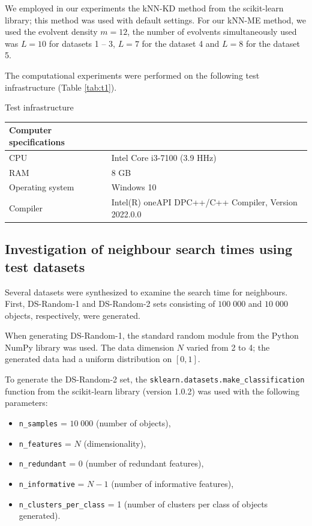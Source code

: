 \documentclass[entropy,article,submit,moreauthors,pdftex]{Definitions/mdpi}
\begin{document}
\begin{paracol}{2}
We employed in our experiments the kNN-KD method from the scikit-learn library; this method was used with default settings. For our kNN-ME method, we used the evolvent density $m=12$, the number of evolvents simultaneously used was $L=10$ for datasets 1 -- 3, $L=7$ for the dataset 4 and $L=8$ for the dataset 5.


The computational experiments were performed on the following test infrastructure (Table \ref{tab:t1}).

\begin{specialtable}[H] 
    \caption{Test infrastructure}\label{tab:t1}
	\center
\begin{tabular}{ll}
\toprule
	  Computer specifications & \\
\midrule													
		CPU & Intel Core i3-7100 (3.9 HHz) \\
		RAM & 8 GB \\ 
		Operating system & Windows 10 \\
		Compiler & Intel(R) oneAPI DPC++/C++ Compiler, Version 2022.0.0 \\
\bottomrule
\end{tabular}
\end{specialtable}

\subsection{Investigation of neighbour search times using test datasets}

Several datasets were synthesized to examine the search time for neighbours. First, DS-Random-1 and DS-Random-2 sets consisting of $100\;000$ and $10\;000$ objects, respectively, were generated.

When generating DS-Random-1, the standard random module from the Python NumPy library was used. The data dimension $N$ varied from 2 to 4; the generated data had a uniform distribution on $[0, 1]$.

To generate the DS-Random-2 set, the \texttt{sklearn.datasets.make\_classification} function from the scikit-learn library (version 1.0.2) was used with the following parameters: 

\begin{itemize}
\item \texttt{n\_samples} = $10\;000$ (number of objects),
\item \texttt{n\_features} =  $N$ (dimensionality),
\item \texttt{n\_redundant} = 0 (number of redundant features),
\item \texttt{n\_informative} = $N - 1$  (number of informative features),
\item \texttt{n\_clusters\_per\_class} = 1 (number of clusters per class of objects generated).
\end{itemize}
  

\end{paracol}
\end{document}
